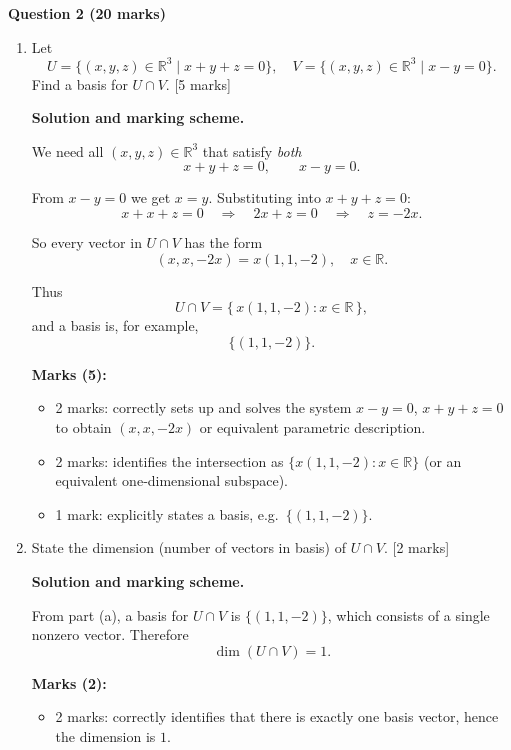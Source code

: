 \documentclass{article}
\begin{document}
\textbf{Question 2 (20 marks)}
\begin{enumerate}[label=(\alph*)]

    \item Let
    \[
    U = \{ (x,y,z) \in \mathbb{R}^3 \mid x+y+z = 0 \}, \quad V = \{(x,y,z) \in \mathbb{R}^3 \mid x-y = 0 \}.
    \]
    Find a basis for $U \cap V$. [5 marks]

    \begin{mdframed}[linecolor=black, linewidth=1pt]
    \textbf{Solution and marking scheme.}
    
    We need all $(x,y,z)\in\mathbb{R}^3$ that satisfy \emph{both}
    \[
    x+y+z=0,
    \qquad
    x-y=0.
    \]
    
    From $x-y=0$ we get $x=y$. Substituting into $x+y+z=0$:
    \[
    x + x + z = 0 \quad\Rightarrow\quad 2x + z = 0 \quad\Rightarrow\quad z = -2x.
    \]
    
    So every vector in $U\cap V$ has the form
    \[
    (x,x,-2x) = x(1,1,-2), \quad x\in\mathbb{R}.
    \]
    
    Thus
    \[
    U\cap V = \{\,x(1,1,-2): x\in\mathbb{R}\,\},
    \]
    and a basis is, for example,
    \[
    \{(1,1,-2)\}.
    \]
    
    \textbf{Marks (5):}
    \begin{itemize}
      \item 2 marks: correctly sets up and solves the system $x-y=0$, $x+y+z=0$ to obtain $(x,x,-2x)$ or equivalent parametric description.
      \item 2 marks: identifies the intersection as $\{x(1,1,-2):x\in\mathbb{R}\}$ (or an equivalent one‑dimensional subspace).
      \item 1 mark: explicitly states a basis, e.g.\ $\{(1,1,-2)\}$.
    \end{itemize}
    \end{mdframed}
    
    \item State the dimension (number of vectors in basis) of $U \cap V$. [2 marks]

    \begin{mdframed}[linecolor=black, linewidth=1pt]
    \textbf{Solution and marking scheme.}

    From part (a), a basis for $U\cap V$ is $\{(1,1,-2)\}$, which consists of a single nonzero vector. Therefore
    \[
    \dim(U\cap V) = 1.
    \]
    
    \textbf{Marks (2):}
    \begin{itemize}
      \item 2 marks: correctly identifies that there is exactly one basis vector, hence the dimension is $1$.
    \end{itemize}
    \end{mdframed}
    

\end{enumerate}
\end{document}
